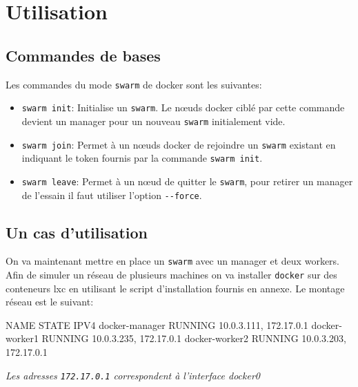 \chapter{Utilisation}

\section{Commandes de bases}

Les commandes du mode \verb:swarm: de docker sont les suivantes:
\begin{itemize}
	\item \verb:swarm init:: Initialise un \verb:swarm:. Le nœuds docker ciblé par 
        cette commande devient un manager pour un nouveau \verb:swarm: initialement vide.
	\item \verb:swarm join:: Permet à un nœuds docker de rejoindre un \verb:swarm: existant
        en indiquant le token fournis par la commande \verb:swarm init:.
    \item \verb:swarm leave:: Permet à un nœud de quitter le \verb:swarm:, pour retirer un 
        manager de l'essain il faut utiliser l'option \verb:--force:.
\end{itemize}

\section{Un cas d'utilisation}

On va maintenant mettre en place un \verb:swarm: avec un manager et deux workers. Afin de
simuler un réseau de plusieurs machines on va installer \verb:docker: sur des conteneurs
lxc en utilisant le script d'installation fournis en annexe. Le montage réseau est le suivant:
\begin{bash}
NAME           STATE            IPV4        
docker-manager RUNNING 10.0.3.111, 172.17.0.1
docker-worker1 RUNNING 10.0.3.235, 172.17.0.1
docker-worker2 RUNNING 10.0.3.203, 172.17.0.1
\end{bash} 
\begin{center}
    \emph{Les adresses \verb:172.17.0.1: correspondent à l'interface docker0}
\end{center}
\jmp


